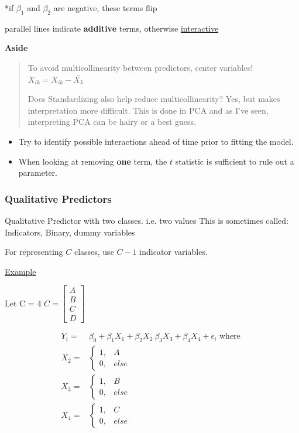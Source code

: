 \documentclass[11pt]{article}
\begin{document}
*if \(\beta_1\) and \(\beta_2\) are negative, these terms flip

parallel lines indicate \textbf{additive} terms, otherwise \uline{interactive}

\textbf{Aside}
\begin{quote}
To avoid multicollinearity between predictors, center variables!
 \(X_{ik} = X_{ik} - \bar{X_k}\)

Does Standardizing also help reduce multicollinearity? Yes, but makes
interpretation more difficult. This is done in PCA and as I've seen,
interpreting PCA can be hairy or a best guess.
\end{quote}


\begin{itemize}
\item Try to identify possible interactions ahead of time prior to fitting the
model.
\item When looking at removing \textbf{one} term, the \(t\) statistic is sufficient to rule
out a parameter.
\end{itemize}

\subsubsection{Qualitative Predictors}
\label{sec:org58067a0}
Qualitative Predictor with two classes. i.e. two values
This is sometimes called: Indicators, Binary, dummy variables

For representing \(C\) classes, use \(C - 1\) indicator variables.

\uline{Example}

Let C = 4
\(C =\begin{bmatrix}
A\\
B\\
C\\
D
\end{bmatrix}\)

\begin{equation}
\begin{split}
Y_i = & \beta_0 + \beta_1 X_1 + \beta_2 X_2 \ \beta_3 X_3 + \beta_4 X_4 + \epsilon_i \text{ where }\\
X_2 = & \begin{cases}
1, &  A\\
0, & else
\end{cases}\\
X_3 = & \begin{cases}
1, &  B\\
0, & else
\end{cases}\\
X_4 = & \begin{cases}
1, &  C\\
0, & else
\end{cases}
\end{split}
\end{equation}
\end{document}
